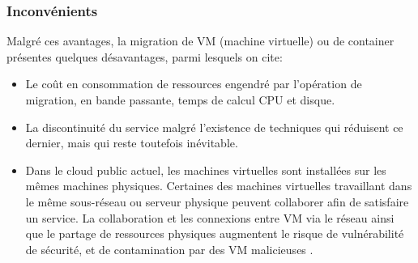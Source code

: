 \subsubsection{Inconvénients}
Malgré ces avantages, la migration de VM (machine virtuelle) ou de container présentes quelques désavantages, parmi lesquels on cite:
\begin{itemize}
  \item Le coût en consommation de ressources engendré par l'opération de migration, en bande passante, temps de calcul CPU et disque.
  \item La discontinuité du service malgré l'existence de techniques qui réduisent ce dernier, mais qui reste toutefois inévitable.
  \item Dans le cloud public actuel, les machines virtuelles sont installées sur les mêmes machines physiques. Certaines des machines virtuelles travaillant dans le même sous-réseau ou serveur physique peuvent collaborer afin de satisfaire un service. La collaboration et les connexions entre VM via le réseau ainsi que le partage de ressources physiques augmentent le risque de vulnérabilité de sécurité, et de contamination par des VM malicieuses \cite{chandrakala2018}.
\end{itemize}
